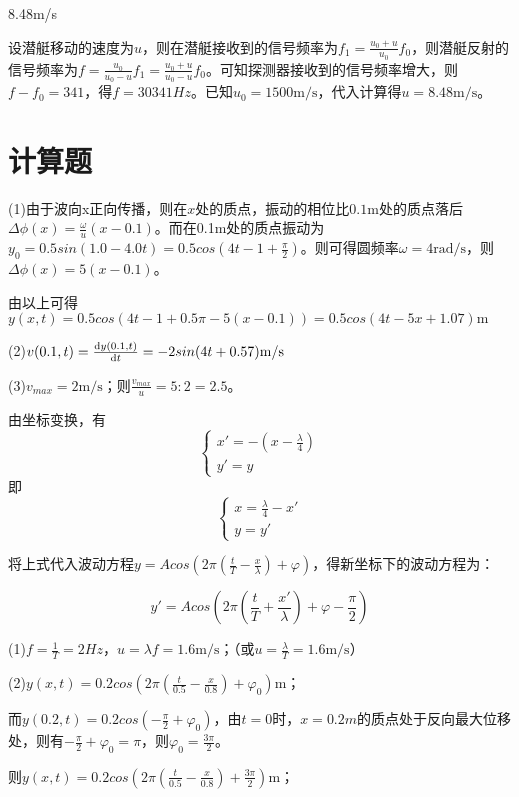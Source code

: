 \exercise 8.48m/s

\solve 设潜艇移动的速度为$u$，则在潜艇接收到的信号频率为$f_1=\frac{u_0+u}{u_0}f_0$，则潜艇反射的信号频率为$f=\frac{u_0}{u_0-u}f_1=\frac{u_0+u}{u_0-u}f_0$。可知探测器接收到的信号频率增大，则$f-f_0=341$，得$f=30341Hz$。已知$u_0=1500\mathrm{m/s}$，代入计算得$u=8.48\mathrm{m/s}$。


\section{计算题}
\exercise

\solve (1)由于波向x正向传播，则在$x$处的质点，振动的相位比$0.1$m处的质点落后$\Delta \phi(x)=\frac{\omega}{u}(x-0.1)$。而在0.1m处的质点振动为$y_0=0.5sin(1.0-4.0t)=0.5cos(4t-1+\frac{\pi}{2})$。则可得圆频率$\omega=4\mathrm{rad/s}$，则$\Delta \phi(x)=5(x-0.1)$。

由以上可得$y(x,t)=0.5cos(4t-1+0.5\pi-5(x-0.1))=0.5cos(4t-5x+1.07)\mathrm{m}$

(2)$v(0.1,t)=\frac{\mathrm{d}y(0.1,t)}{\mathrm{d}t}=-2sin(4t+0.57)\mathrm{m/s}$

(3)$v_{max}=2\mathrm{m/s}$；则$\frac{v_{max}}{u}=5:2=2.5$。

\exercise 

\solve 由坐标变换，有
\[
\begin{cases}
	x'=-(x-\frac{\lambda}{4})\\
	y'=y
\end{cases}
\]
即
\[
\begin{cases}
	x=\frac{\lambda}{4}-x'\\
	y=y'
\end{cases}
\]

将上式代入波动方程$y=Acos(2\pi(\frac{t}{T}-\frac{x}{\lambda})+\varphi)$，得新坐标下的波动方程为：

$$y'=Acos(2\pi(\frac{t}{T}+\frac{x'}{\lambda})+\varphi-\frac{\pi}{2})$$

\exercise

\solve (1)$f=\frac{1}{T}=2Hz$，$u=\lambda f=1.6\mathrm{m/s}$；（或$u=\frac{\lambda}{T}=1.6\mathrm{m/s}$）

(2)$y(x,t)=0.2cos(2\pi(\frac{t}{0.5}-\frac{x}{0.8})+\varphi_0)\mathrm{m}$；

而$y(0.2,t)=0.2cos(-\frac{\pi}{2}+\varphi_0)$，由$t=0$时，$x=0.2m$的质点处于反向最大位移处，则有$-\frac{\pi}{2}+\varphi_0=\pi$，则$\varphi_0=\frac{3\pi}{2}$。

则$y(x,t)=0.2cos(2\pi(\frac{t}{0.5}-\frac{x}{0.8})+\frac{3\pi}{2})\mathrm{m}$；

